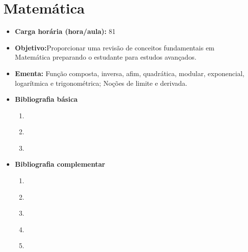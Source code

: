 \documentclass[
	10pt,				%
	openright,			%
	twoside,			%
	a4paper,			%
	english,			%
	french,				%
	brazil,				%
	sumario=tradicional
]{abntex2}
\begin{document}
\section*{Matemática}\label{1_matematica}
\begin{itemize}
	\item \textbf{Carga horária (hora/aula):} 81
	\item \textbf{Objetivo:}Proporcionar uma revisão de conceitos fundamentais em Matemática preparando o estudante para estudos avançados.
	\item \textbf{Ementa:} 
	Função composta, inversa, afim, quadrática, modular, exponencial, logarítmica e trigonométrica; Noções de limite e derivada.
	\item \textbf{Bibliografia básica}
	\begin{enumerate}
		\item \cite{iezzi2013fundamentos01}
		\item \cite{iezzi2013fundamentos02}
		\item \cite{iezzi2013fundamentos03}
	\end{enumerate}
	\item \textbf{Bibliografia complementar}
	\begin{enumerate}
		\item \cite{iezzi2013fundamentos06}
		\item \cite{iezzi2013fundamentos08}
		\item \cite{giovanni2002matematica}
		\item \cite{thomas2002calculo}
		\item \cite{morettin2017estatistica}
	\end{enumerate}	
\end{itemize}


\newpage
\end{document}
